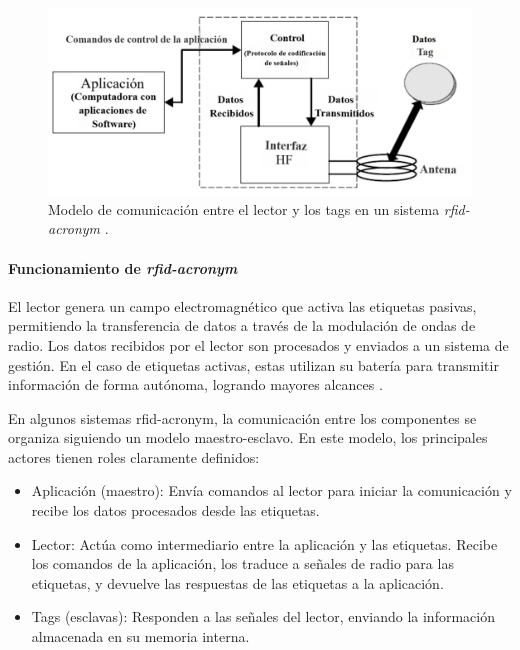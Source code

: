 \begin{figure}[H]
\leavevmode
\begin{minipage}{\textwidth}
\begin{center}
\includegraphics[scale=0.3]{./capitulo_02/figures/RFIDmodelsf.png}
\caption{Modelo de comunicación entre el lector y los tags en un sistema \textit{\acrshort{rfid-acronym}} \cite{RFidtech}. \label{fig:RFIDCommunication}}
\end{center}
\end{minipage}
\end{figure}


\paragraph{Funcionamiento de \textit{\acrshort{rfid-acronym}}\\}

El lector genera un campo electromagnético que activa las etiquetas pasivas, permitiendo la transferencia de datos a través de la modulación de ondas de radio. Los datos recibidos por el lector son procesados y enviados a un sistema de gestión. En el caso de etiquetas activas, estas utilizan su batería para transmitir información de forma autónoma, logrando mayores alcances \cite{8550722}.

En algunos sistemas \acrshort{rfid-acronym}, la comunicación entre los componentes se organiza siguiendo un modelo maestro-esclavo. En este modelo, los principales actores tienen roles claramente definidos:
\begin{itemize}
    \item Aplicación (maestro): Envía comandos al lector para iniciar la comunicación y recibe los datos procesados desde las etiquetas.
    \item Lector: Actúa como intermediario entre la aplicación y las etiquetas. Recibe los comandos de la aplicación, los traduce a señales de radio para las etiquetas, y devuelve las respuestas de las etiquetas a la aplicación.
    \item Tags (esclavas): Responden a las señales del lector, enviando la información almacenada en su memoria interna.
\end{itemize}

